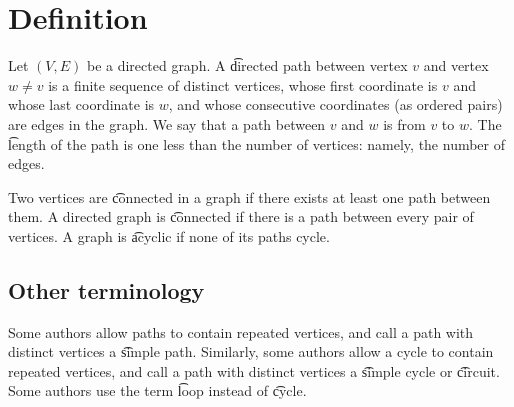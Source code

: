 
\section*{Definition}

Let $(V, E)$ be a directed graph.
A \t{directed path} between vertex $v$ and vertex $w \neq v$ is a finite sequence of distinct vertices, whose first coordinate is $v$ and whose last coordinate is $w$, and whose consecutive coordinates (as ordered pairs) are edges in the graph.
We say that a path between $v$ and $w$ is from $v$ to $w$.
The \t{length} of the path is one less than the number of vertices: namely, the number of edges.

Two vertices are \t{connected} in a graph if there exists at least one path between them.
A directed graph is \t{connected} if there is a path between every pair of vertices.
A graph is \t{acyclic} if none of its paths cycle.

\subsection*{Other terminology}

Some authors allow paths to contain repeated vertices, and call a path with distinct vertices a \t{simple path}.
Similarly, some authors allow a cycle to contain repeated vertices, and call a path with distinct vertices a \t{simple cycle} or \t{circuit}.
Some authors use the term \t{loop} instead of \t{cycle}.

\blankpage
